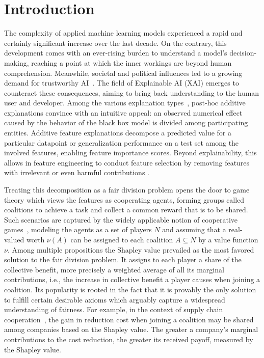 \section{Introduction}
\label{sec:intr}

The complexity of applied machine learning models experienced a rapid and certainly significant increase over the last decade.
On the contrary, this development comes with an ever-rising burden to understand a model's decision-making, reaching a point at which the inner workings are beyond human comprehension. %
Meanwhile, societal and political influences led to a growing demand for trustworthy AI~\citep{Li2023}.
The field of Explainable AI (XAI) emerges to counteract these consequences, aiming to bring back understanding to the human user and developer.
Among the various explanation types~\citep{Molnar2021}, post-hoc additive explanations convince with an intuitive appeal: an observed numerical effect caused by the behavior of the black box model is divided among participating entities.
Additive feature explanations decompose a predicted value for a particular datapoint \cite{Lundberg.2017} or generalization performance on a test set \citep{Covert.2020} among the involved features, enabling feature importance scores.
Beyond explainability, this allows in feature engineering to conduct feature selection by removing features with irrelevant or even harmful contributions \citep{Cohen.2005, Marcilio2020}.

Treating this decomposition as a fair division problem opens the door to game theory which views the features as cooperating agents, forming groups called coalitions to achieve a task and collect a common reward that is to be shared.
Such scenarios are captured by the widely applicable notion of cooperative games~\citep{Peleg2007}, modeling the agents as a set of players $N$ and assuming that a real-valued worth $\nu(A)$ can be assigned to each coalition $A \subseteq N$ by a value function $\nu$.
Among multiple propositions the Shapley value \citep{Shapley.1953} prevailed as the most favored solution to the fair division problem.
It assigns to each player a share of the collective benefit, more precisely a weighted average of all its marginal contributions, i.e., the increase in collective benefit a player causes when joining a coalition.
Its popularity is rooted in the fact that it is provably the only solution to fulfill certain desirable axioms \citep{Shapley.1953} which arguably capture a widespread understanding of fairness.
For example, in the context of supply chain cooperation~\citep{Fiestras-Janeiro2011}, the gain in reduction cost when joining a coalition may be shared among companies based on the Shapley value.
The greater a company's marginal contributions to the cost reduction, the greater its received payoff, measured by the Shapley value.

